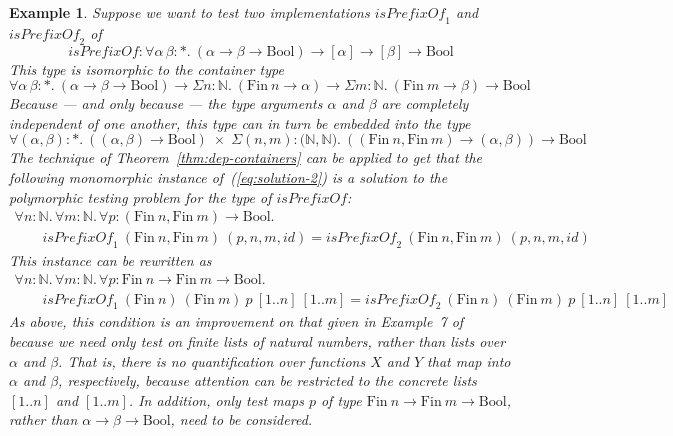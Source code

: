 \documentclass{article}[12 pt]
\newtheorem{example}{Example}
\theoremstyle{problemstyle}
\begin{document}
\begin{example}\label{ex:isprefixof}
Suppose we want to test two implementations $\mathit{isPrefixOf}_1$
and $\mathit{isPrefixOf}_2$ of
\begin{displaymath}
\mathit{isPrefixOf} : \forall \alpha \, \beta : *.~(\alpha \to \beta
\to \mathrm{Bool}) \to [\alpha] \to [\beta] \to \mathrm{Bool}
\end{displaymath}
\noindent 
This type is isomorphic to the container type
\begin{displaymath}
\forall \alpha \, \beta : *.~(\alpha \to \beta \to \mathrm{Bool}) \to
\Sigma n : \mathbb{N}.~(\mathrm{Fin}~n \rightarrow \alpha) \to
\Sigma m : \mathbb{N}.~(\mathrm{Fin}~m \rightarrow \beta) 
\to \mathrm{Bool}
\end{displaymath}
\noindent
Because --- and only because --- the type arguments $\alpha$ and
$\beta$ are completely independent of one another, this type can in
turn be embedded into the type
\begin{displaymath}
\forall (\alpha, \beta) : *.~((\alpha, \beta) \to \mathrm{Bool}) \;
\times \; \Sigma (n,m) : (\mathbb{N}, \mathbb{N)}.~((\mathrm{Fin}~n,
\mathrm{Fin}~m) \rightarrow (\alpha, \beta)) \to \mathrm{Bool}
\end{displaymath}
\noindent
The technique of Theorem~\ref{thm:dep-containers}
can be applied to get that the following monomorphic instance
of~(\ref{eq:solution-2}) is a solution to the polymorphic testing
problem for the type of $\mathit{isPrefixOf}$:
\[\begin{array}{l}
\forall n : \mathbb{N}.\, \forall m:\mathbb{N}.\, \forall p :
(\mathrm{Fin}~n, \mathrm{Fin}~m) \to
\mathrm{Bool}.\\ ~~~~~~~~~\mathit{isPrefixOf}_1~(\mathrm{Fin}~n,
\mathrm{Fin}~m)~(p, n,m,\mathit{id}) =
\mathit{isPrefixOf}_2~(\mathrm{Fin}~n,\mathrm{Fin}~m)~(p,
n,m,\mathit{id})
\end{array}\]
\noindent
This instance can be rewritten as
\[\begin{array}{l}
\forall n : \mathbb{N}.\, \forall m:\mathbb{N}.\, \forall p :
\mathrm{Fin}~n \rightarrow \mathrm{Fin}~m \to
\mathrm{Bool}.\\ ~~~~~~~~~\mathit{isPrefixOf}_1~(\mathrm{Fin}~n)~(\mathrm{Fin}~m)~p~[1..n]~[1..m]
=
\mathit{isPrefixOf}_2~(\mathrm{Fin}~n)~(\mathrm{Fin}~m)~p~[1..n]~[1..m]
\end{array}\]
\noindent
As above, this condition is an improvement on that given in Example~7
of~\cite{bjc10} because we need only test on finite lists of natural
numbers, rather than lists over $\alpha$ and $\beta$. That is, there
is no quantification over functions $X$ and $Y$ that map into $\alpha$
and $\beta$, respectively, because attention can be restricted to the
concrete lists $[1..n]$ and $[1..m]$. In addition, only test maps $p$
of type $\mathrm{Fin}~n \rightarrow \mathrm{Fin}~m \to \mathrm{Bool}$,
rather than $\alpha \to \beta \to \mathrm{Bool}$, need to be
considered.
\end{example}
\end{document}
